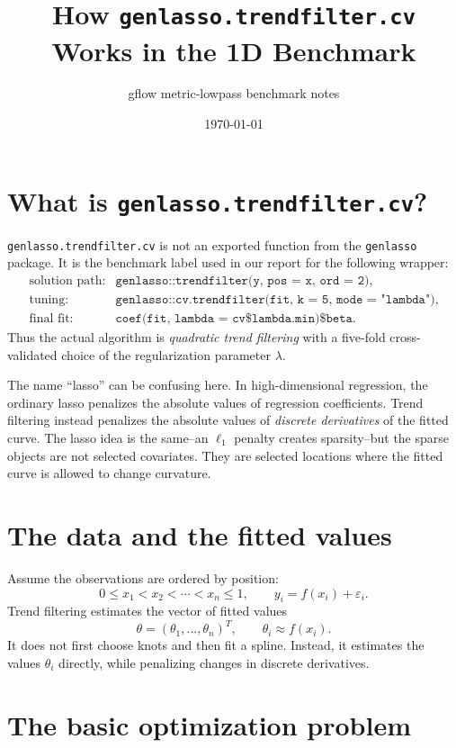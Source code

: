 \documentclass[11pt]{article}
\title{How \texttt{genlasso.trendfilter.cv} Works in the 1D Benchmark}
\author{gflow metric-lowpass benchmark notes}
\date{\today}
\begin{document}
\maketitle

\section{What is \texttt{genlasso.trendfilter.cv}?}

\texttt{genlasso.trendfilter.cv} is not an exported function from the
\texttt{genlasso} package. It is the benchmark label used in our report for the
following wrapper:
\[
\begin{array}{ll}
\text{solution path:} & \texttt{genlasso::trendfilter(y, pos = x, ord = 2)},\\[2mm]
\text{tuning:} & \texttt{genlasso::cv.trendfilter(fit, k = 5, mode = "lambda")},\\[2mm]
\text{final fit:} & \texttt{coef(fit, lambda = cv\$lambda.min)\$beta}.
\end{array}
\]
Thus the actual algorithm is \emph{quadratic trend filtering} with a
five-fold cross-validated choice of the regularization parameter
\(\lambda\).

The name ``lasso'' can be confusing here. In high-dimensional regression, the
ordinary lasso penalizes the absolute values of regression coefficients. Trend
filtering instead penalizes the absolute values of \emph{discrete derivatives}
of the fitted curve. The lasso idea is the same--an \(\ell_1\) penalty creates
sparsity--but the sparse objects are not selected covariates. They are selected
locations where the fitted curve is allowed to change curvature.

\section{The data and the fitted values}

Assume the observations are ordered by position:
\[
0 \le x_1 < x_2 < \cdots < x_n \le 1,
\qquad
y_i = f(x_i) + \varepsilon_i.
\]
Trend filtering estimates the vector of fitted values
\[
\theta = (\theta_1,\ldots,\theta_n)^T,
\qquad
\theta_i \approx f(x_i).
\]
It does not first choose knots and then fit a spline. Instead, it estimates the
values \(\theta_i\) directly, while penalizing changes in discrete derivatives.

\section{The basic optimization problem}
\end{document}
